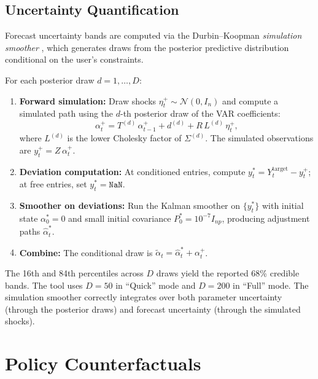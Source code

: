 \documentclass[11pt]{article}
\theoremstyle{definition}
\theoremstyle{remark}
\begin{document}
\subsection{Uncertainty Quantification}\label{sec:uncertainty}

Forecast uncertainty bands are computed via the Durbin--Koopman
\emph{simulation smoother} \citep{DurbinKoopman2002}, which generates
draws from the posterior predictive distribution conditional on the
user's constraints.

For each posterior draw $d = 1, \ldots, D$:
\begin{enumerate}
  \item \textbf{Forward simulation:} Draw shocks
    $\eta_t^+ \sim \mathcal{N}(0, I_n)$ and compute a simulated path
    using the $d$-th posterior draw of the VAR coefficients:
    \begin{equation}\label{eq:sim_forward}
      \alpha_{t}^+ = T^{(d)}\, \alpha_{t-1}^+ + d^{(d)}
      + R\, L^{(d)}\,\eta_t^+,
    \end{equation}
    where $L^{(d)}$ is the lower Cholesky factor of $\Sigma^{(d)}$.
    The simulated observations are $y_t^+ = Z\, \alpha_t^+$.
  \item \textbf{Deviation computation:} At conditioned entries,
    compute $y_t^* = Y_t^{\text{target}} - y_t^+$; at free entries,
    set $y_t^* = \texttt{NaN}$.
  \item \textbf{Smoother on deviations:} Run the Kalman smoother
    on $\{y_t^*\}$ with initial state $\alpha_0^* = 0$ and small
    initial covariance $P_0^* = 10^{-7} I_{np}$, producing
    adjustment paths $\hat\alpha_t^*$.
  \item \textbf{Combine:} The conditional draw is
    $\tilde\alpha_t = \hat\alpha_t^* + \alpha_t^+$.
\end{enumerate}
The 16th and 84th percentiles across $D$ draws yield the reported
68\% credible bands.  The tool uses $D = 50$ in ``Quick'' mode
and $D = 200$ in ``Full'' mode.  The simulation smoother correctly
integrates over both parameter uncertainty (through the posterior
draws) and forecast uncertainty (through the simulated shocks).


\section{Policy Counterfactuals}\label{sec:counterfactual}
\end{document}
